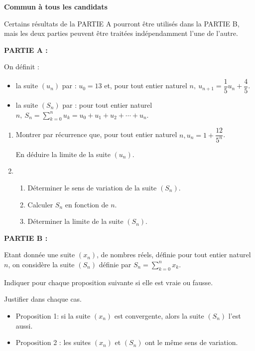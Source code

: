  
\textbf{Commun  à tous les candidats}
 
Certains résultats de la PARTIE A pourront être utilisés dans la PARTIE B, mais les deux parties peuvent être traitées indépendamment l'une de l'autre. 

\medskip

 \textbf{PARTIE A :}
  
On définit :
\begin{itemize}
\item la suite $\left(u_{n}\right)$ par : $u_{0} = 13$ et, pour tout entier naturel $n,~ u_{n+1}  = \dfrac{1}{5}u_{n} +\dfrac{4}{5}$. 
\item la suite $\left(S_{n}\right)$ par : pour tout entier naturel $n,~ S_{n} = \displaystyle\sum_{k=0}^n u_{k} =  u_{0} +u_{1} +u_{2} + \cdots + u_{n}$.
\end{itemize}

\begin{enumerate}
\item  Montrer par récurrence que, pour tout entier naturel $n, u_{n} =  1 + \dfrac{12}{5^n}$.  

En déduire la limite de la suite $\left(u_{n}\right)$. 
\item  
	\begin{enumerate}
		\item  Déterminer le sens de variation de la suite $\left(S_{n}\right)$. 
		\item Calculer $S_{n}$ en fonction de $n$. 
		\item Déterminer la limite de la suite $\left(S_{n}\right)$. 
	\end{enumerate}
\end{enumerate}

\medskip

\textbf{PARTIE B : }
 
Etant donnée une suite $\left(x_{n}\right)$, de nombres réels, définie pour tout entier naturel $n$, on considère la suite $\left(S_{n}\right)$ 
définie par $S_{n} =  \displaystyle\sum_{k=0}^n x_{k}$.
 
Indiquer pour chaque proposition suivante si elle est vraie ou fausse.

 Justifier dans chaque cas. 
 
\begin{itemize}
\item[] Proposition 1: si la suite $\left(x_{n}\right)$ est convergente, alors la suite $\left(S_{n}\right)$ l'est aussi. 
\item[] Proposition 2 : les suites $\left(x_{n}\right)$ et $\left(S_{n}\right)$ ont le même sens de variation. 
\end{itemize}